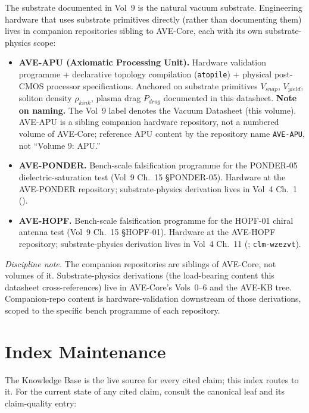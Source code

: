The substrate documented in Vol~9 is the natural vacuum substrate. Engineering hardware that uses substrate primitives directly (rather than documenting them) lives in companion repositories sibling to AVE-Core, each with its own substrate-physics scope:

\begin{itemize}
    \item \textbf{AVE-APU (Axiomatic Processing Unit).} Hardware validation programme + declarative topology compilation (\texttt{atopile}) + physical post-CMOS processor specifications. Anchored on substrate primitives $V_{snap}$, $V_{yield}$, soliton density $\rho_{kink}$, plasma drag $P_{drag}$ documented in this datasheet. \textbf{Note on naming.} The Vol~9 label denotes the Vacuum Datasheet (this volume). AVE-APU is a sibling companion hardware repository, not a numbered volume of AVE-Core; reference APU content by the repository name \texttt{AVE-APU}, not ``Volume 9: APU.''
    \item \textbf{AVE-PONDER.} Bench-scale falsification programme for the PONDER-05 dielectric-saturation test (Vol~9 Ch.~15 \S PONDER-05). Hardware at the AVE-PONDER repository; substrate-physics derivation lives in Vol~4 Ch.~1 ().
    \item \textbf{AVE-HOPF.} Bench-scale falsification programme for the HOPF-01 chiral antenna test (Vol~9 Ch.~15 \S HOPF-01). Hardware at the AVE-HOPF repository; substrate-physics derivation lives in Vol~4 Ch.~11 (; \texttt{clm-wzezvt}).
\end{itemize}

\noindent
\textit{Discipline note.} The companion repositories are siblings of AVE-Core, not volumes of it. Substrate-physics derivations (the load-bearing content this datasheet cross-references) live in AVE-Core's Vols~0--6 and the AVE-KB tree. Companion-repo content is hardware-validation downstream of those derivations, scoped to the specific bench programme of each repository.

\section{Index Maintenance}
\label{sec:vol9_xref_maintenance}

The Knowledge Base is the live source for every cited claim; this index routes to it. For the current state of any cited claim, consult the canonical leaf and its claim-quality entry:

